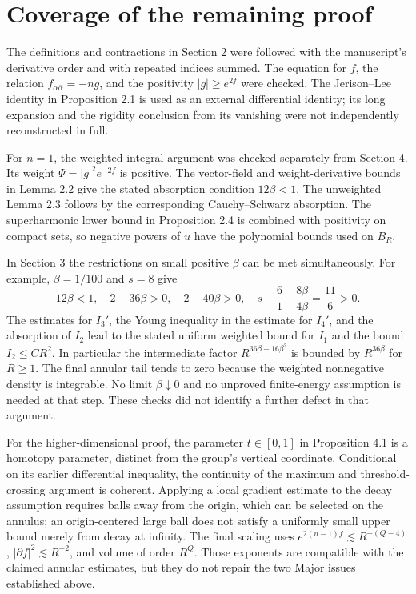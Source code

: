 \documentclass[10pt]{article}
\begin{document}
\section*{Coverage of the remaining proof}
The definitions and contractions in Section 2 were followed with the manuscript’s derivative order and with repeated indices summed. The equation for \(f\), the relation \(f_{\alpha\bar\alpha}=-ng\), and the positivity \(|g|\geq e^{2f}\) were checked. The Jerison–Lee identity in Proposition 2.1 is used as an external differential identity; its long expansion and the rigidity conclusion from its vanishing were not independently reconstructed in full.\par
For \(n=1\), the weighted integral argument was checked separately from Section 4. Its weight \(\Psi=|g|^2e^{-2f}\) is positive. The vector-field and weight-derivative bounds in Lemma 2.2 give the stated absorption condition \(12\beta<1\). The unweighted Lemma 2.3 follows by the corresponding Cauchy–Schwarz absorption. The superharmonic lower bound in Proposition 2.4 is combined with positivity on compact sets, so negative powers of \(u\) have the polynomial bounds used on \(B_R\).\par
In Section 3 the restrictions on small positive \(\beta\) can be met simultaneously. For example, \(\beta=1/100\) and \(s=8\) give \[12\beta<1,\quad 2-36\beta>0,\quad 2-40\beta>0,\quad
 s-\frac{6-8\beta}{1-4\beta}=\frac{11}{6}>0.\] The estimates for \(I_3'\), the Young inequality in the estimate for \(I_4'\), and the absorption of \(I_2\) lead to the stated uniform weighted bound for \(I_1\) and the bound \(I_2\leq CR^2\). In particular the intermediate factor \(R^{36\beta-16\beta^2}\) is bounded by \(R^{36\beta}\) for \(R\geq1\). The final annular tail tends to zero because the weighted nonnegative density is integrable. No limit \(\beta\downarrow0\) and no unproved finite-energy assumption is needed at that step. These checks did not identify a further defect in that argument.\par
For the higher-dimensional proof, the parameter \(t\in[0,1]\) in Proposition 4.1 is a homotopy parameter, distinct from the group’s vertical coordinate. Conditional on its earlier differential inequality, the continuity of the maximum and threshold-crossing argument is coherent. Applying a local gradient estimate to the decay assumption requires balls away from the origin, which can be selected on the annulus; an origin-centered large ball does not satisfy a uniformly small upper bound merely from decay at infinity. The final scaling uses \(e^{2(n-1)f}\lesssim R^{-(Q-4)}\), \(|\partial f|^2\lesssim R^{-2}\), and volume of order \(R^Q\). Those exponents are compatible with the claimed annular estimates, but they do not repair the two Major issues established above.\par
\end{document}
